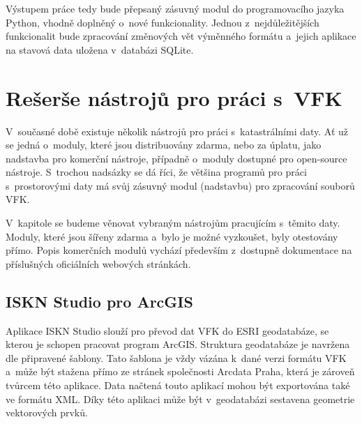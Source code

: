 \documentclass[a4paper,12pt,oneside]{book}
\begin{document}
Výstupem práce tedy bude přepsaný zásuvný modul do programovacího
jazyka Python, vhodně doplněný o~nové funkcionality. Jednou
z~nejdůležitějších funkcionalit bude zpracování změnových vět výměnného 
formátu a~jejich aplikace na stavová data uložena v~databázi SQLite.


\clearpage
\rhead{{\rightmark}}
\chapter{Rešerše nástrojů pro práci s~VFK}

V~současné době existuje několik nástrojů pro práci s~katastrálními
daty. Ať už se jedná o~moduly, které jsou distribuovány zdarma, nebo
za úplatu, jako nadstavba pro komerční nástroje, případně o~moduly
dostupné pro open-source nástroje. S~trochou nadsázky se dá říci, že
většina programů pro práci s~prostorovými daty má svůj zásuvný
modul (nadstavbu) pro zpracování souborů VFK.

V~kapitole se budeme věnovat vybraným nástrojům pracujícím
s~těmito daty. Moduly, které jsou šířeny zdarma a~bylo je možné
vyzkoušet, byly otestovány přímo. Popis komerčních modulů vychází
především z~dostupně dokumentace na příslušných oficiálních webových
stránkách.

\section{ISKN Studio pro ArcGIS}
\label{l_iskn_studio}
Aplikace ISKN Studio slouží pro převod dat VFK do ESRI geodatabáze, se
kterou je schopen pracovat program ArcGIS. Struktura geodatabáze je
navržena dle připravené šablony. Tato šablona je vždy vázána k~dané
verzi formátu VFK a~může být stažena přímo ze stránek společnosti
Arcdata Praha, která je zároveň tvůrcem této aplikace. Data načtená
touto aplikací mohou být exportována také ve formátu
XML. Díky této aplikaci může být v~geodatabázi sestavena
geometrie vektorových prvků. \cite{iskn_studio}
\end{document}

